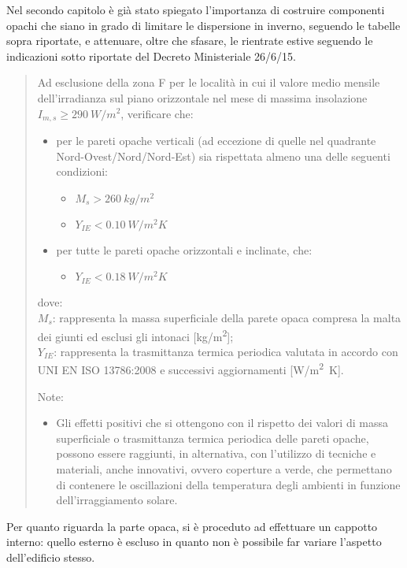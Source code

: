 Nel secondo capitolo è già stato spiegato l'importanza di costruire componenti opachi che siano in grado di limitare le dispersione in inverno, seguendo le tabelle sopra riportate, e attenuare, oltre che sfasare, le rientrate estive seguendo le indicazioni sotto riportate del Decreto Ministeriale 26/6/15.
\begin{quote}
	Ad esclusione della zona F per le località in cui il valore medio mensile dell'irradianza sul piano orizzontale nel mese di massima insolazione $I_{m,s} \ge \SI{290}{W/m^2}$, verificare che:
	\begin{itemize}
		\item per le pareti opache verticali (ad eccezione di quelle nel quadrante Nord-Ovest/Nord/Nord-Est) sia rispettata almeno una delle seguenti condizioni:
		\begin{itemize}
			\item $M_s > \SI{260}{kg/m^2}$
			\item $Y_{IE}<\SI{0.10}{W/m^2K}$
		\end{itemize}
		\item per tutte le pareti opache orizzontali e inclinate, che:
		\begin{itemize}
			\item $Y_{IE}<\SI{0.18}{W/m^2K}$
		\end{itemize}
	\end{itemize}
	dove:\\
	$M_s$: rappresenta la massa superficiale della parete opaca compresa la malta dei giunti ed esclusi gli intonaci [\si{kg/m^2}];\\
	$Y_{IE}$: rappresenta la trasmittanza termica periodica valutata in accordo con UNI EN ISO 13786:2008 e successivi aggiornamenti [\si{W/m^2K}].
	
	Note:
	\begin{itemize}
		\item Gli effetti positivi che si ottengono con il rispetto dei valori di massa superficiale o trasmittanza termica periodica delle pareti opache, possono essere raggiunti, in alternativa, con l'utilizzo di tecniche e materiali, anche innovativi, ovvero coperture a verde, che permettano di contenere le oscillazioni della temperatura degli ambienti in funzione dell'irraggiamento solare. \sdots
	\end{itemize}
\end{quote}

Per quanto riguarda la parte opaca, si è proceduto ad effettuare un cappotto interno: quello esterno è escluso in quanto non è possibile far variare l'aspetto dell'edificio stesso. 

